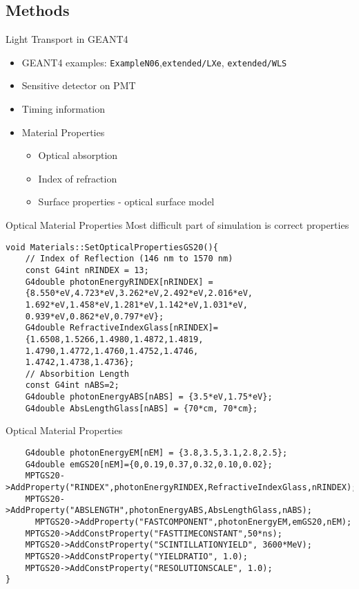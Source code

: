 \subsection{Methods}
\begin{frame}[fragile]{Light Transport in GEANT4}
\begin{itemize}
  \item GEANT4 examples: \verb+ExampleN06+,\verb+extended/LXe+, \verb+extended/WLS+
  \item Sensitive detector on PMT
  \item Timing information
  \item Material Properties
  \small
  \begin{itemize}
    \item Optical absorption
    \item Index of refraction
    \item Surface properties - optical surface model \cite{5485130}
  \end{itemize}
\end{itemize}
\end{frame}
\begin{frame}[fragile]{Optical Material Properties}
Most difficult part of simulation is correct properties
\begin{lstlisting}
void Materials::SetOpticalPropertiesGS20(){
    // Index of Reflection (146 nm to 1570 nm)
    const G4int nRINDEX = 13;
    G4double photonEnergyRINDEX[nRINDEX] = 
    {8.550*eV,4.723*eV,3.262*eV,2.492*eV,2.016*eV,
    1.692*eV,1.458*eV,1.281*eV,1.142*eV,1.031*eV, 
    0.939*eV,0.862*eV,0.797*eV};
    G4double RefractiveIndexGlass[nRINDEX]=
    {1.6508,1.5266,1.4980,1.4872,1.4819,    
    1.4790,1.4772,1.4760,1.4752,1.4746,    
    1.4742,1.4738,1.4736};
    // Absorbition Length
    const G4int nABS=2;
    G4double photonEnergyABS[nABS] = {3.5*eV,1.75*eV};
    G4double AbsLengthGlass[nABS] = {70*cm, 70*cm};  
\end{lstlisting}
\end{frame}
\begin{frame}[fragile]{Optical Material Properties}
\begin{lstlisting}
    G4double photonEnergyEM[nEM] = {3.8,3.5,3.1,2.8,2.5};
    G4double emGS20[nEM]={0,0.19,0.37,0.32,0.10,0.02};
    MPTGS20->AddProperty("RINDEX",photonEnergyRINDEX,RefractiveIndexGlass,nRINDEX);
    MPTGS20->AddProperty("ABSLENGTH",photonEnergyABS,AbsLengthGlass,nABS);
	  MPTGS20->AddProperty("FASTCOMPONENT",photonEnergyEM,emGS20,nEM);
    MPTGS20->AddConstProperty("FASTTIMECONSTANT",50*ns);
    MPTGS20->AddConstProperty("SCINTILLATIONYIELD", 3600*MeV);
    MPTGS20->AddConstProperty("YIELDRATIO", 1.0);
    MPTGS20->AddConstProperty("RESOLUTIONSCALE", 1.0);
}
\end{lstlisting}
\end{frame}
